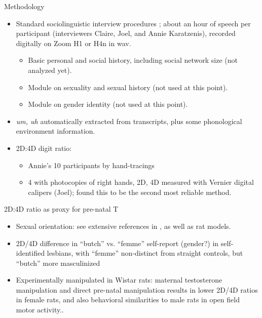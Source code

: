 \documentclass[hyperref={pdfpagelabels=false}]{beamer}
\begin{document}
\begin{frame}{Methodology}
\begin{itemize}
	\item Standard sociolinguistic interview procedures \citep{tagliamonte2006}; about an hour of speech per participant (interviewers Claire, Joel, and Annie Karatzenis), recorded digitally on Zoom H1 or H4n in wav.
		\begin{itemize}
			\item Basic personal and social history, including social network size (not analyzed yet).
			\item Module on sexuality and sexual history (not used at this point).
			\item Module on gender identity (not used at this point).
		\end{itemize}
	\item \textsl{um, uh} automatically extracted from transcripts, plus some phonological environment information.
	\item 2D:4D digit ratio:
		\begin{itemize}
		\item Annie's 10 participants by hand-tracings
		\item  4 with photocopies of right hands, 2D, 4D measured with Vernier digital calipers (Joel); \citet{allawayetal2009} found this to be the second most reliable method.
		\end{itemize}
\end{itemize}
\end{frame}


\begin{frame}{2D:4D ratio as proxy for pre-natal T}
\begin{itemize}
	
	\item Sexual orientation: see extensive references in \citet{balthazart2011}, as well as rat models.
	\item 2D/4D difference in ``butch'' vs. ``femme'' self-report (gender?) in self-identified lesbians, with ``femme'' non-distinct from straight controls, but ``butch'' more masculinized \citep{brownetal2002}
	\item Experimentally manipulated in Wistar rats: maternal testosterone manipulation and direct pre-natal manipulation results in lower 2D/4D ratios in female rats, and also behavioral similarities to male rats in open field motor activity.\citep{talarovicovaetal2009}.
	\end{itemize}

\end{frame}
\end{document}
